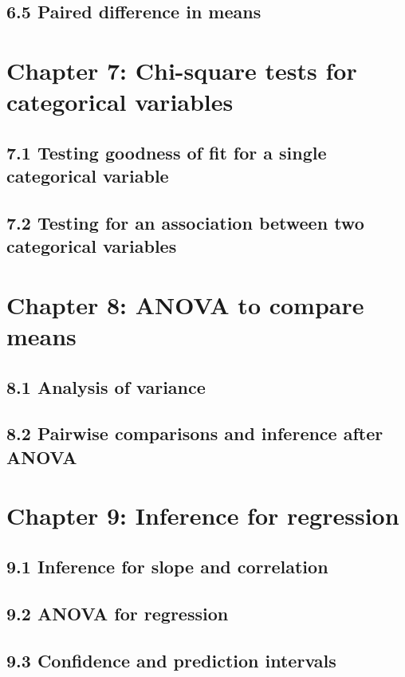 \documentclass{article}
\begin{document}
\subsection{6.5 Paired difference in means}

\section{Chapter 7: Chi-square tests for categorical variables}
\subsection{7.1 Testing goodness of fit for a single categorical variable}
\subsection{7.2 Testing for an association between two categorical variables}

\section{Chapter 8: ANOVA to compare means}
\subsection{8.1 Analysis of variance}
\subsection{8.2 Pairwise comparisons and inference after ANOVA}

\section{Chapter 9: Inference for regression}
\subsection{9.1 Inference for slope and correlation}
\subsection{9.2 ANOVA for regression}
\subsection{9.3 Confidence and prediction intervals}
\end{document}
